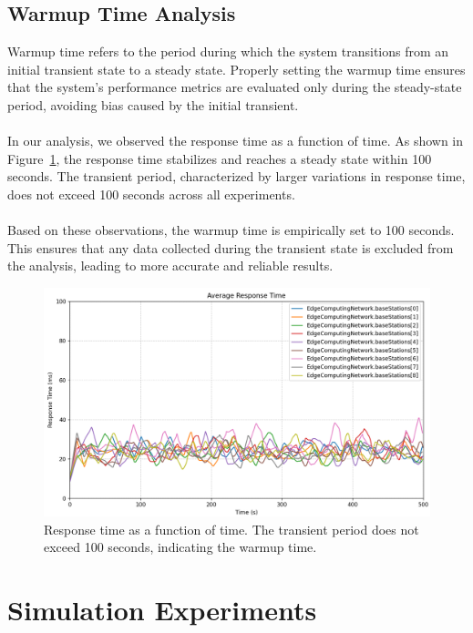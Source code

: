 \documentclass{report}
\begin{document}
\section{Warmup Time Analysis}
Warmup time refers to the period during which the system transitions from an initial transient state to a steady state. Properly setting the warmup time ensures that the system's performance metrics are evaluated only during the steady-state period, avoiding bias caused by the initial transient.\\\\
In our analysis, we observed the response time as a function of time. As shown in Figure~\ref{fig:warmup_time}, the response time stabilizes and reaches a steady state within 100 seconds. The transient period, characterized by larger variations in response time, does not exceed 100 seconds across all experiments.\\\\
Based on these observations, the warmup time is empirically set to 100 seconds. This ensures that any data collected during the transient state is excluded from the analysis, leading to more accurate and reliable results.

\begin{figure}[h!]
    \centering
    \includegraphics[width=1\textwidth]{img/warmup_analysis.png}
    \caption{Response time as a function of time. The transient period does not exceed 100 seconds, indicating the warmup time.}
    \label{fig:warmup_time}
\end{figure}

\chapter{Simulation Experiments}
\end{document}
